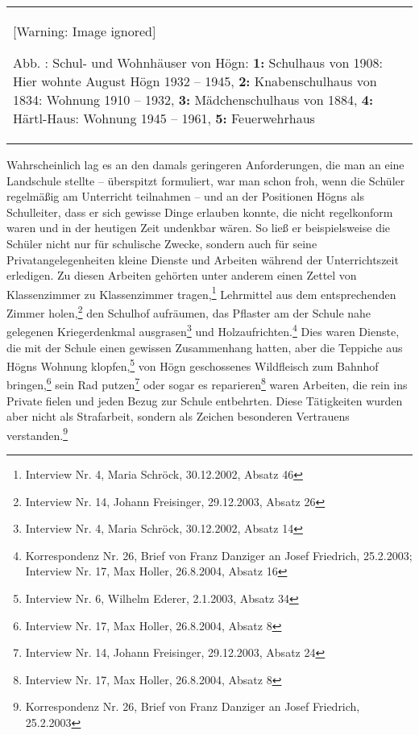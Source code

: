\documentclass[a4paper]{article}
\newcounter{Abb}
\renewcommand\theAbb{\arabic{Abb}}
\begin{document}
\begin{center}
\begin{minipage}{10.931cm}
\begin{flushleft}
\tablefirsthead{}
\tablehead{}
\tabletail{}
\tablelasttail{}
\begin{supertabular}{m{10.731cm}}
  [Warning: Image ignored] %
 
Abb. \stepcounter{Abb}{\theAbb}: Schul- und Wohnhäuser von Högn:
\textbf{1:} Schulhaus von 1908: Hier wohnte August Högn 1932 – 1945,
\textbf{2:} Knabenschulhaus von 1834: Wohnung 1910 – 1932, \textbf{3:}
Mädchenschulhaus von 1884, \textbf{4:} Härtl-Haus: Wohnung 1945 – 1961,
\textbf{5:} Feuerwehrhaus\\
\end{supertabular}
\end{flushleft}
\end{minipage}
\end{center}
Wahrscheinlich lag es an den damals geringeren Anforderungen, die man an
eine Landschule stellte – überspitzt formuliert, war man schon froh,
wenn die Schüler regelmäßig am Unterricht teilnahmen – und an der
Positionen Högns als Schulleiter, dass er sich gewisse Dinge erlauben
konnte, die nicht regelkonform waren und in der heutigen Zeit undenkbar
wären. So ließ er beispielsweise die Schüler nicht nur für schulische
Zwecke, sondern auch für seine Privatangelegenheiten kleine Dienste und
Arbeiten während der Unterrichtszeit erledigen. Zu diesen Arbeiten
gehörten unter anderem einen Zettel von Klassenzimmer zu Klassenzimmer
tragen,\footnote{ Interview Nr. 4, Maria Schröck, 30.12.2002, Absatz
46} Lehrmittel aus dem entsprechenden Zimmer holen,\footnote{ Interview
Nr. 14, Johann Freisinger, 29.12.2003, Absatz 26} den Schulhof
aufräumen, das Pflaster am der Schule nahe gelegenen Kriegerdenkmal
ausgrasen\footnote{ Interview Nr. 4, Maria Schröck, 30.12.2002, Absatz
14} und Holzaufrichten.\footnote{ Korrespondenz Nr. 26, Brief von Franz
Danziger an Josef Friedrich, 25.2.2003; Interview Nr. 17, Max Holler,
26.8.2004, Absatz 16} Dies waren Dienste, die mit der Schule einen
gewissen Zusammenhang hatten, aber die Teppiche aus Högns Wohnung
klopfen,\footnote{ Interview Nr. 6, Wilhelm Ederer, 2.1.2003, Absatz
34} von Högn geschossenes Wildfleisch zum Bahnhof bringen,\footnote{
Interview Nr. 17, Max Holler, 26.8.2004, Absatz 8} sein Rad
putzen\footnote{ Interview Nr. 14, Johann Freisinger, 29.12.2003,
Absatz 24} oder sogar es reparieren\footnote{ Interview Nr. 17, Max
Holler, 26.8.2004, Absatz 8} waren Arbeiten, die rein ins Private
fielen und jeden Bezug zur Schule entbehrten. Diese Tätigkeiten wurden
aber nicht als Strafarbeit, sondern als Zeichen besonderen Vertrauens
verstanden.\footnote{ Korrespondenz Nr. 26, Brief von Franz Danziger an
Josef Friedrich, 25.2.2003}
\end{document}
